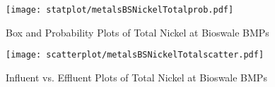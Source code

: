         \begin{figure}[hb]   %
            \centering
            \texttt{[image: statplot/metalsBSNickelTotalprob.pdf]}
            \caption{Box and Probability Plots of Total Nickel at Bioswale BMPs}
        \end{figure}         %
        
        
        \begin{figure}[hb]   %
            \centering
            \texttt{[image: scatterplot/metalsBSNickelTotalscatter.pdf]}
            \caption{Influent vs. Effluent Plots of Total Nickel at Bioswale BMPs}
        \end{figure}         %
        \clearpage
        